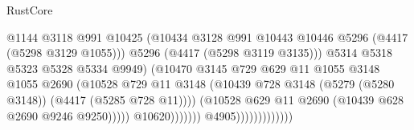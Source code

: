 \begin{lexlean}{RustCore}
\begin{coremodule}
                                                    @1144
                                                    @3118
                                                    @991
                                                    @10425
                                                    (@10434
                                                      @3128
                                                      @991
                                                      @10443
                                                      @10446
                                                      @5296
                                                      (@4417 (@5298 @3129 @1055)))
                                                    @5296
                                                    (@4417 (@5298 @3119 @3135)))
                                                  @5314
                                                  @5318
                                                  @5323
                                                  @5328
                                                  @5334
                                                  @9949)
                                                (@10470
                                                  @3145
                                                  @729
                                                  @629
                                                  @11
                                                  @1055
                                                  @3148
                                                  @1055
                                                  @2690
                                                  (@10528
                                                    @729
                                                    @11
                                                    @3148
                                                    (@10439
                                                      @728
                                                      @3148
                                                      (@5279 (@5280 @3148))
                                                      (@4417 (@5285 @728 @11))))
                                                  (@10528
                                                    @629
                                                    @11
                                                    @2690
                                                    (@10439 @628 @2690 @9246 @9250)))))
                                            @10620)))))))
                              @4905)))))))))))))

\end{coremodule}
\end{lexlean}
